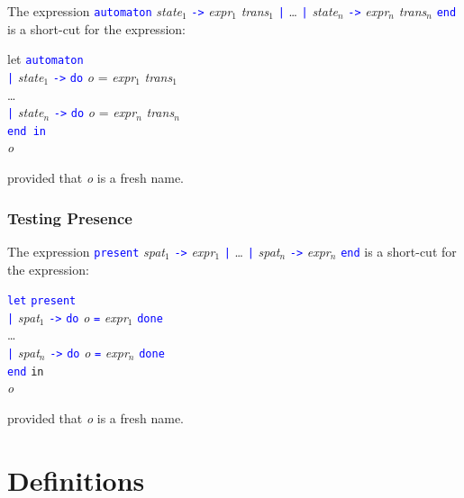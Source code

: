 \documentclass[11pt,titlepage,twoside]{report}
\newcommand{\In}{\mbox{{\tt in}}}
\newcommand{\Minusgreater}{\mbox{{\tt ->}}}
\newcommand{\term}[1]{\textcolor{Blue}{\tt #1}}
\newcommand{\nterm}[1]{\textcolor{BrickRed}{\it #1}}
\newcommand{\term}[1]{{\tt #1}}
\newcommand{\nterm}[1]{{\em #1}}
\begin{document}
The expression 
\term{automaton} \nterm{state}$_1$ \term{\Minusgreater} \nterm{expr}$_1$ 
                 \nterm{trans}$_1$ 
\term{|} \dots
\term{|} \nterm{state}$_n$ \term{\Minusgreater} \nterm{expr}$_n$ 
                 \nterm{trans}$_n$ \term{end} is a short-cut
for the expression:

\begin{tabbing}
let \= \term{automaton} \\
    \> \term{|} \nterm{state}$_1$ \term{\Minusgreater} 
                 \term{do} \nterm{o} = \nterm{expr}$_1$ \nterm{trans}$_1$ \\
    \> \dots \\
    \> \term{|} \nterm{state}$_n$ \term{\Minusgreater} 
              \term{do} \nterm{o} = \nterm{expr}$_n$ \nterm{trans}$_n$ \\
    \> \term{end in} \\
\nterm{o}
\end{tabbing}
provided that \nterm{o} is a fresh name.

\subsubsection{Testing Presence} %

The expression
\term{present}
  \nterm{spat}$_1$ \term{\Minusgreater} \nterm{expr}$_1$ \term{|} \dots 
\term{|} \nterm{spat}$_n$ \term{\Minusgreater} \nterm{expr}$_n$ \term{end}
is a short-cut for the expression:

\begin{center}
\begin{tabbing}
\term{let} \= \term{present} \\
           \> \term{|} \nterm{spat}$_1$ \term{\Minusgreater} 
               \term{do} \nterm{o} \term{=} \nterm{expr}$_1$ \term{done} \\
           \> \dots \\
           \> \term{|} \nterm{spat}$_n$ \term{\Minusgreater} 
               \term{do} \nterm{o} \term{=} \nterm{expr}$_n$ \term{done} \\
           \> \term{end} \In \\
\nterm{o}
\end{tabbing}
\end{center}
provided that \nterm{o} is a fresh name.

\section{Definitions\label{langdefs}} %
\end{document}
